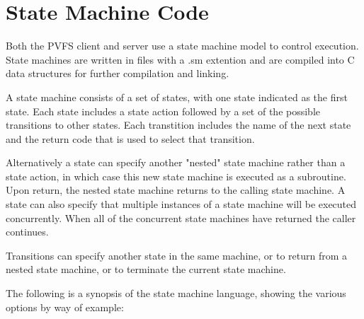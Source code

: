 
\section{State Machine Code}

Both the PVFS client and server use a state machine model to control
execution.  State machines are written in files with a .sm extention and
are compiled into C data structures for further compilation and linking.

A state machine consists of a set of states, with one state indicated as
the first state.  Each state includes a state action followed by a set of
the possible transitions to other states.  Each transtition includes the
name of the next state and the return code that is used to select that
transition.

Alternatively a state can specify another "nested" state machine rather
than a state action, in which case this new state machine is executed as
a subroutine.  Upon return, the nested state machine returns to the
calling state machine.  A state can also specify that multiple instances
of a state machine will be executed concurrently.  When all of the
concurrent state machines have returned the caller continues.

Transitions can specify another state in the same machine, or to return
from a nested state machine, or to terminate the current state machine.

The following is a synopsis of the state machine language, showing the
various options by way of example:

